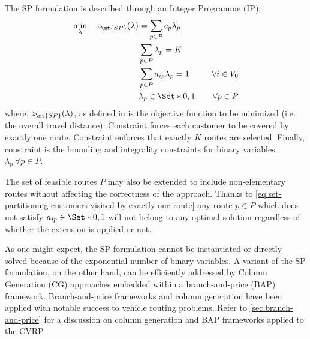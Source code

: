 The SP formulation is described through an Integer Programme (IP):
\begin{align}
	\min_{\lambda} \quad z_\mt{SP}(\lambda) & = \sum_{p \in P}  c_p \lambda_p \label{eq:set-partitioning-obj-func}                                                                                                                                           \\
	                                        & \sum_{p \in P} \lambda_{p} = K\label{eq:set-partitioning-K-routes}                                                                                                                                             \\
	                                        & \sum_{p \in P}  a_{ip} \lambda_p = 1                                 & \quad \forall i \in V_0                                              \label{eq:set-partitioning-customers-visited-by-exactly-one-route} \\
	                                        & \lambda_p                    \in \Set*{0, 1}                         & \quad \forall p \in P \label{eq:set-partitioning-lambda-mip-var-bounds}
\end{align}
where, $z_\mt{SP}(\lambda)$, as defined in  is the objective function to be minimized (i.e. the overall travel distance).
Constraint  forces each customer to be covered by exactly one route.
Constraint  enforces that exactly $K$ routes are selected.
Finally, constraint  is the bounding and integrality constraints for binary variables $\lambda_p \ \forall p \in P$.

The set of feasible routes $P$ may also be extended to include non-elementary routes
without affecting the correctness of the approach.
Thanks to \cref{eq:set-partitioning-customers-visited-by-exactly-one-route}
any route $p \in P$ which does not satisfy $a_{ip} \in \Set*{0, 1}$
will not belong to any optimal solution
regardless of whether the extension is applied or not.

As one might expect, the SP formulation
cannot be instantiated or directly solved
because of the exponential number of binary variables.
A variant of the SP formulation, on the other hand,
can be efficiently addressed by Column Generation (CG) approaches
embedded within a branch-and-price (BAP) framework.
Branch-and-price frameworks and column generation have been applied
with notable success to vehicle routing problems.
Refer to \cref{sec:branch-and-price} for a discussion on
column generation and BAP frameworks applied to the CVRP.

